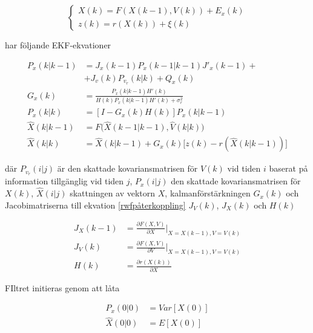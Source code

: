 \documentclass[11pt]{article}
\begin{document}
\begin{flushleft}
\begin{equation}
	\begin{cases}
	X(k) = F(X(k-1),V(k)) + E_x(k) \\
	z(k) = r(X(k)) + \xi(k)
	\end{cases}
\end{equation}

har följande EKF-ekvationer

\begin{equation*}
	\begin{aligned}
	P_x(k|k-1) &= J_x(k-1) P_x(k-1|k-1)J'_x(k-1) + \\
	&+ J_v(k)P_{v_r}(k|k) + Q_x(k) \\
	G_x(k) &= \frac {P_x(k | k-1) H'(k)} {H(k)P_x(k|k-1)H'(k) + \sigma_r^2} \\
	P_x(k|k) &= [I - G_x(k)H(k)] P_x(k |  k - 1) \\
	\hat{X}(k|k-1) &= F \Big(\hat{X}(k-1 | k-1), \hat{V}(k | k) \Big) \\
	\hat{X}(k | k) &= \hat{X}(k | k - 1) + G_x(k) \Big[ z(k) - r(\hat{X}(k | k -1)) \Big] 
	\end{aligned}
\end{equation*}

där $P_{v_r}(i|j)$ är den skattade kovariansmatrisen för $V(k)$ vid tiden $i$ baserat på information tillgänglig vid tiden $j$, $P_x(i|j)$ den skattade kovariansmatrisen för $X(k)$, $\hat{X}(i|j)$ skattningen av vektorn $X$, kalmanförstärkningen $G_x(k)$ och Jacobimatriserna till ekvation \eqref{rwfpåterkoppling} $J_V(k)$, $J_X(k)$ och $H(k)$

\begin{equation*}
	\begin{aligned}
	J_X(k-1) &= \frac {\partial F(X,V)} {\partial X} \Big|_{X=X(k-1),V=V(k)} \\
	J_V(k) &=  \frac {\partial F(X,V)} {\partial V} \Big|_{X=X(k-1),V=V(k)} \\
	H(k) &=  \frac {\partial r (X(k))} {\partial X}
	\end{aligned}
\end{equation*}

FIltret initieras genom att låta 

\begin{equation*}
	\begin{aligned}
	P_x(0|0) &= Var [X(0)] \\
	\hat{X}(0|0) &= E[X(0)]
	\end{aligned}
\end{equation*}


\end{flushleft}
\end{document}
